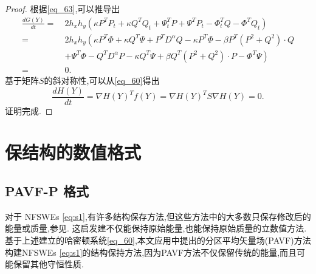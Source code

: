 \begin{proof}
	根据\eqref{eq_63},可以推导出
\begin{align}\label{eq_64}
\frac{d G(Y)}{d t}=&~2 h_{x} h_{y}\left(\kappa P^{T}P_t+\kappa Q^{T}Q_t+\Psi^{T}_t P+\Psi^{T}P_{t}-\varPhi^{T}_t Q-\varPhi^{T}Q_{t}\right)\nonumber\\
=&~2 h_{x} h_{y}\left(\kappa P^{T}\varPhi+\kappa Q^{T}\Psi + P^{T}D^{\alpha}Q-\kappa P^{T}\varPhi-\beta P^{T}\left( P^{2}+Q^{2}\right)\cdot Q\right.\nonumber\\
&~\left.+\Psi^{T}\varPhi-Q^{T}D^{\alpha}P-\kappa Q^{T}\Psi+\beta Q^{T}\left( P^{2}+Q^{2}\right)\cdot P-\varPhi^{T}\Psi\right)\nonumber\\
=&~0.
\end{align}
基于矩阵$S$的斜对称性,可以从\eqref{eq_60}得出
\begin{equation}\label{eq_65}
\frac{d H(Y)}{d t}=\nabla H(Y)^{T} f(Y)=\nabla H(Y)^{T} S \nabla H(Y)=0 .
\end{equation}
证明完成.
\end{proof}

\section{保结构的数值格式}\label{Section 3}
\subsection{PAVF-P 格式}

对于 NFSWEs \eqref{eq:s1},有许多结构保存方法,但这些方法中的大多数只保存修改后的能量或质量,参见\cite{liFastEnergyConserving2018,huEfficientEnergyPreserving2022}.
这启发建不仅能保持原始能量,也能保持原始质量的立数值方法.基于上述建立的哈密顿系统\eqref{eq_60},本文应用\cite{caiPartitionedAveragedVector2018}中提出的分区平均矢量场(PAVF)方法构建NFSWEs \eqref{eq:s1}的结构保持方法,因为PAVF方法不仅保留传统的能量,而且可能保留其他守恒性质.

